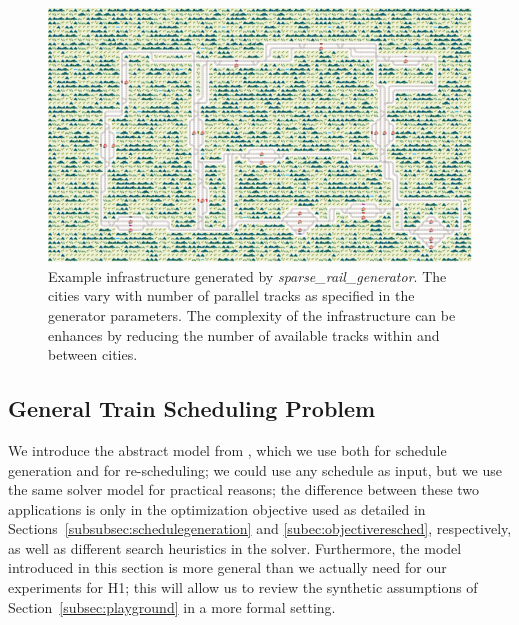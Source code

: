 \documentclass{article}
\begin{document}
\begin{figure}[hbtp]
	\centering
  \includegraphics[width=\textwidth]{Figures/flatland_map.png}
	\caption{Example infrastructure generated by \textit{sparse\_rail\_generator}. The cities vary with number of parallel tracks as specified in the generator parameters. The complexity of the infrastructure can be enhances by reducing the number of available tracks within and between cities.}
	\label{fig:flatland_map}
\end{figure}


\subsection{General Train Scheduling Problem}\label{subsubsec:scheduleproblemdescription}



We introduce the abstract model from \cite{DBLP:journals/corr/abs-2003-08598}, which we use both for schedule generation and for re-scheduling; we could use any schedule as input, but we use the same solver model for practical reasons; the difference between these two applications is only in the optimization objective used as detailed in Sections~\ref{subsubsec:schedulegeneration} and \ref{subec:objectiveresched}, respectively, as well as different search heuristics in the solver.
Furthermore, the model introduced in this section is more general than we actually need for our experiments for H1; this will allow us to review the synthetic assumptions of Section~\ref{subsec:playground} in a more formal setting.
\end{document}
